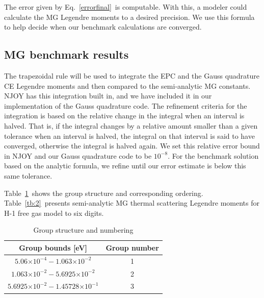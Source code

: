 \documentclass[review]{elsarticle}
\newcommand{\e}[1]{\ensuremath{\times10^{#1}}}
\begin{document}
The error given by Eq.~\eqref{errorfinal}~is computable. With this, a modeler could calculate the MG Legendre moments to a desired precision. We use this formula to help decide when our benchmark calculations are converged.%
\subsection{MG benchmark results}

The trapezoidal rule will be used to integrate the EPC and the Gauss quadrature CE Legendre moments and then compared to the semi-analytic MG constants. NJOY has this integration  built in, and we have included it in our implementation of the Gauss quadrature code.  The refinement criteria for the integration is based on the relative change in the integral when an interval is halved. That is, if the integral changes by a relative amount smaller than a given tolerance when  an interval is halved, the integral on that interval is said to have converged, otherwise the integral is halved again. We set this relative error bound in NJOY and our Gauss quadrature code to be $10^{-8}$. 
For the benchmark solution based on the analytic formula, we refine until our error estimate is below this same tolerance.  %

Table~\ref{tb:1}~shows the group structure and corresponding ordering. Table~\ref{tb:2}~presents semi-analytic MG thermal scattering Legendre moments for H-1 free gas model to six digits.
\begin{table}[h]
\centering
\caption{Group structure and numbering}
\label{tb:1}
\begin{tabular}{|c|c|}
\hline
Group bounds [eV] & Group number\\
\hline
$5.06\e{-4}-1.063\e{-2}$ &  1\\
\hline
$1.063\e{-2}-5.6925\e{-2}$ & 2\\
\hline
$5.6925\e{-2}-1.45728\e{-1}$ & 3\\
\hline

\end{tabular}

\end{table}
\end{document}
